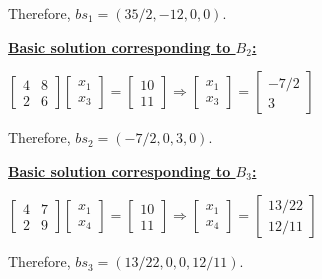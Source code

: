 \documentclass{article}
\begin{document}
\noindent
Therefore, $bs_1 = (35/2, -12, 0, 0)$.
\newline

\noindent
\textbf{\underline{Basic solution corresponding to $B_2$:}}

\noindent
\newline
$
\begin{bmatrix}
  4 & 8 \\
  2 & 6
\end{bmatrix}
\begin{bmatrix}
  x_1 \\
  x_3
\end{bmatrix}
=
\begin{bmatrix}
 10 \\
 11 
\end{bmatrix}
\Rightarrow
\begin{bmatrix}
  x_1 \\
  x_3
\end{bmatrix}
=
\begin{bmatrix}
  -7/2 \\
  3
\end{bmatrix}
$
\newline

\noindent
Therefore, $bs_2 = (-7/2, 0, 3, 0)$.
\newline

\noindent
\textbf{\underline{Basic solution corresponding to $B_3$:}}

\noindent
\newline
$
\begin{bmatrix}
  4 & 7 \\
  2 & 9
\end{bmatrix}
\begin{bmatrix}
  x_1 \\
  x_4
\end{bmatrix}
=
\begin{bmatrix}
 10 \\
 11 
\end{bmatrix}
\Rightarrow
\begin{bmatrix}
  x_1 \\
  x_4
\end{bmatrix}
=
\begin{bmatrix}
  13/22 \\
 12/11
\end{bmatrix}
$
\newline

\noindent
Therefore, $bs_3 = (13/22, 0, 0, 12/11)$.
\newline
\end{document}
